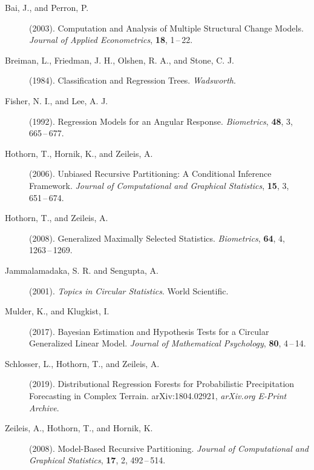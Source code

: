 \documentclass[twoside]{report}
\begin{document}

\bigskip

\begin{description}

\item[Bai, J., and Perron, P.] (2003).
     Computation and Analysis of Multiple Structural Change Models.
     {\it Journal of Applied Econometrics}, {\bf 18},
     1\,--\,22.     
     
\item[Breiman, L., Friedman, J. H., Olshen, R. A., and Stone, C. J.] (1984).
     Classification and Regression Trees.
     {\it Wadsworth}.

\item[Fisher, N. I., and Lee, A. J.] (1992).
     Regression Models for an Angular Response.
     {\it Biometrics}, {\bf 48}, 3,
     665\,--\,677.  

\item[Hothorn, T., Hornik, K., and Zeileis, A.] (2006).
     Unbiased Recursive Partitioning: A Conditional Inference Framework.
     {\it Journal of Computational and Graphical Statistics}, {\bf 15}, 3,
     651\,--\,674. 
     
\item[Hothorn, T., and Zeileis, A.] (2008).
     Generalized Maximally Selected Statistics.
     {\it Biometrics}, {\bf 64}, 4,
     1263\,--\,1269. 

\item[Jammalamadaka, S. R. and Sengupta, A.] (2001).
     {\it Topics in Circular Statistics}.
     World Scientific. 

\item[Mulder, K., and Klugkist, I.] (2017).
     Bayesian Estimation and Hypothesis Tests for a Circular Generalized Linear Model.
     {\it Journal of Mathematical Psychology}, {\bf 80},
     4\,--\,14. 



\item[Schlosser, L., Hothorn, T., and Zeileis, A.] (2019).
     Distributional Regression Forests for Probabilistic Precipitation Forecasting in Complex Terrain.
     arXiv:1804.02921, {\it arXiv.org E-Print Archive}.

\item[Zeileis, A., Hothorn, T., and Hornik, K.] (2008).
     Model-Based Recursive Partitioning.
     {\it Journal of Computational and Graphical Statistics}, {\bf 17}, 2,
     492\,--\,514. 
     
\end{description}
\end{document}

